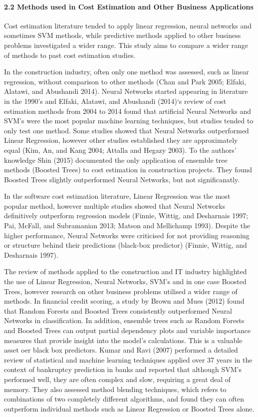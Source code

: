\documentclass[]{elsarticle} %
\begin{document}
\paragraph{2.2 Methods used in Cost Estimation and Other Business
Applications}\label{methods-used-in-cost-estimation-and-other-business-applications}

Cost estimation literature tended to apply linear regression, neural
networks and sometimes SVM methods, while predictive methods applied to
other business problems investigated a wider range. This study aims to
compare a wider range of methods to past cost estimation studies.

In the construction industry, often only one method was assessed, such
as linear regression, without comparison to other methods (Chan and Park
2005; Elfaki, Alatawi, and Abushandi 2014). Neural Networks started
appearing in literature in the 1990's and Elfaki, Alatawi, and Abushandi
(2014)`s review of cost estimation methods from 2004 to 2014 found that
artificial Neural Networks and SVM's were the most popular machine
learning techniques, but studies tended to only test one method. Some
studies showed that Neural Networks outperformed Linear Regression,
however other studies established they are approximately equal (Kim, An,
and Kang 2004; Attalla and Hegazy 2003). To the authors' knowledge Shin
(2015) documented the only application of ensemble tree methods (Boosted
Trees) to cost estimation in construction projects. They found Boosted
Trees slightly outperformed Neural Networks, but not significanatly.

In the software cost estimation literature, Linear Regression was the
most popular method, however multiple studies showed that Neural
Networks definitively outperform regression models (Finnie, Wittig, and
Desharnais 1997; Pai, McFall, and Subramanian 2013; Matson and
Mellichamp 1993). Despite the higher performance, Neural Networks were
criticised for not providing reasoning or structure behind their
predictions (black-box predictor) (Finnie, Wittig, and Desharnais 1997).

The review of methods applied to the construction and IT industry
highlighted the use of Linear Regression, Neural Networks, SVM's and in
one case Boosted Trees, however research on other business problems
utilised a wider range of methods. In financial credit scoring, a study
by Brown and Mues (2012) found that Random Forests and Boosted Trees
consistently outperformed Neural Networks in classification. In
addition, ensemble trees such as Random Forests and Boosted Trees can
output partial dependency plots and variable importance measures that
provide insight into the model's calculations. This is a valuable asset
oer black box predictors. Kumar and Ravi (2007) performed a detailed
review of statistical and machine learning techniques applied over 37
years in the context of bankruptcy prediction in banks and reported that
although SVM's performed well, they are often complex and slow,
requiring a great deal of memory. They also assessed method blending
techniques, which refers to combinations of two completely different
algorithms, and found they can often outperform individual methods such
as Linear Regression or Boosted Trees alone.
\end{document}
